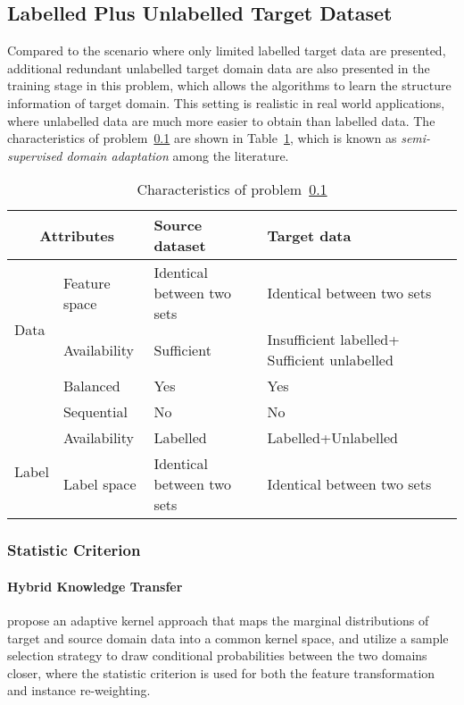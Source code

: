 \documentclass[prodmode]{acmsmall}  %
\begin{document}
\subsection{Labelled Plus Unlabelled Target Dataset}
\label{sec:HOMOsemi}
Compared to the scenario where only limited labelled target data are presented, additional redundant unlabelled target domain data are also presented in the training stage in this problem, which allows the algorithms to learn the structure information of target domain.
This setting is realistic in real world applications, where unlabelled data are much more easier to obtain than labelled data. 
The characteristics of problem~\ref{sec:HOMOsemi} are shown in Table~\ref{tab:HOMOsemi}, which is known as \textit{semi-supervised domain adaptation} among the literature.

\begin{table}[htbp!]
\caption{Characteristics of problem~\ref{sec:HOMOsemi}}
\label{tab:HOMOsemi}
\begin{center}
\begin{small}
\begin{tabular}{|p{1cm}<{\centering}|m{2.5cm}<{\centering}|m{4.3cm}<{\centering}|m{4.3cm}<{\centering}|}
\hline
\multicolumn{2}{|c|}{Attributes} & Source dataset & Target data \\
\hline \hline
\multirow{3}{*}{Data} & Feature space & Identical between two sets & Identical between two sets \\ 
\cline{2-4}{} & Availability & Sufficient & {\color{red}Insufficient labelled+ Sufficient unlabelled} \\
\cline{2-4}{} & Balanced & Yes & Yes \\
\cline{2-4}{} & Sequential & No & No \\
\hline \hline
\multirow{2}{*}{Label} & Availability & Labelled & {\color{red}Labelled+Unlabelled}\\
\cline{2-4}{}  & Label space & Identical between two sets & Identical between two sets \\ 
\hline
\end{tabular}
\end{small}
\end{center}
\end{table}
\subsubsection{Statistic Criterion}
\paragraph{Hybrid Knowledge Transfer}
 propose an adaptive kernel approach that maps the marginal distributions of target and source domain data into a common kernel space, and utilize a sample selection strategy to draw conditional probabilities between the two domains closer, where the statistic criterion is used for both the feature transformation and instance re-weighting.
\end{document}
